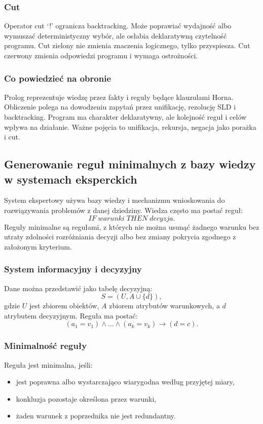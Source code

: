 \subsubsection{Cut}

Operator cut `!' ogranicza backtracking. Może poprawiać wydajność albo wymuszać deterministyczny wybór, ale osłabia deklaratywną czytelność programu. Cut zielony nie zmienia znaczenia logicznego, tylko przyspiesza. Cut czerwony zmienia odpowiedzi programu i wymaga ostrożności.

\subsubsection{Co powiedzieć na obronie}

Prolog reprezentuje wiedzę przez fakty i reguły będące klauzulami Horna. Obliczenie polega na dowodzeniu zapytań przez unifikację, rezolucję SLD i backtracking. Program ma charakter deklaratywny, ale kolejność reguł i celów wpływa na działanie. Ważne pojęcia to unifikacja, rekursja, negacja jako porażka i cut.

\subsection{Generowanie reguł minimalnych z bazy wiedzy w systemach eksperckich}

System ekspertowy używa bazy wiedzy i mechanizmu wnioskowania do rozwiązywania problemów z danej dziedziny. Wiedza często ma postać reguł:
\[
IF\; warunki \; THEN\; decyzja.
\]
Reguły minimalne są regułami, z których nie można usunąć żadnego warunku bez utraty zdolności rozróżniania decyzji albo bez zmiany pokrycia zgodnego z założonym kryterium.

\subsubsection{System informacyjny i decyzyjny}

Dane można przedstawić jako tabelę decyzyjną:
\[
S=(U,A\cup\{d\}),
\]
gdzie $U$ jest zbiorem obiektów, $A$ zbiorem atrybutów warunkowych, a $d$ atrybutem decyzyjnym. Reguła ma postać:
\[
(a_1=v_1)\wedge\dots\wedge(a_k=v_k)\to(d=c).
\]

\subsubsection{Minimalność reguły}

Reguła jest minimalna, jeśli:
\begin{itemize}
  \item jest poprawna albo wystarczająco wiarygodna według przyjętej miary,
  \item konkluzja pozostaje określona przez warunki,
  \item żaden warunek z poprzednika nie jest redundantny.
\end{itemize}

